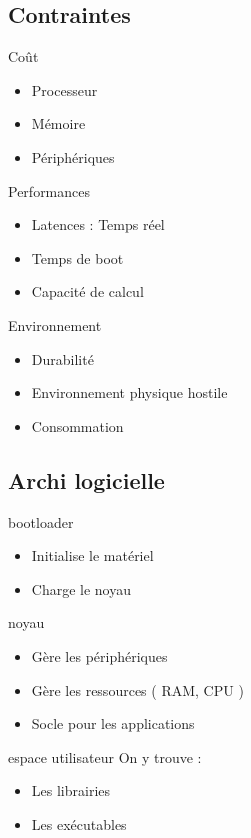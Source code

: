 \subsection{Contraintes}
\begin{frame}
	\begin{block}{Coût}
		\begin{itemize}
			\item Processeur
			\item Mémoire
			\item Périphériques
		\end{itemize}
	\end{block}
	\begin{block}{Performances}
		\begin{itemize}
			\item Latences : Temps réel
			\item Temps de boot
			\item Capacité de calcul
		\end{itemize}
	\end{block}
	\begin{block}{Environnement}
		\begin{itemize}
			\item Durabilité
			\item Environnement physique hostile
			\item Consommation
		\end{itemize}
	\end{block}

\end{frame}
\subsection{Archi logicielle}

\begin{frame}

	\begin{block}{bootloader}
		\begin{itemize}
			\item Initialise le matériel
			\item Charge le noyau
		\end{itemize}
	\end{block}

	\begin{block}{noyau}
		\begin{itemize}
			\item Gère les périphériques
			\item Gère les ressources ( RAM, CPU )
			\item Socle pour les applications
		\end{itemize}
	\end{block}

	\begin{block}{espace utilisateur}
		On y trouve :
		\begin{itemize}
			\item Les librairies
			\item Les exécutables
		\end{itemize}
	\end{block}

\end{frame}

